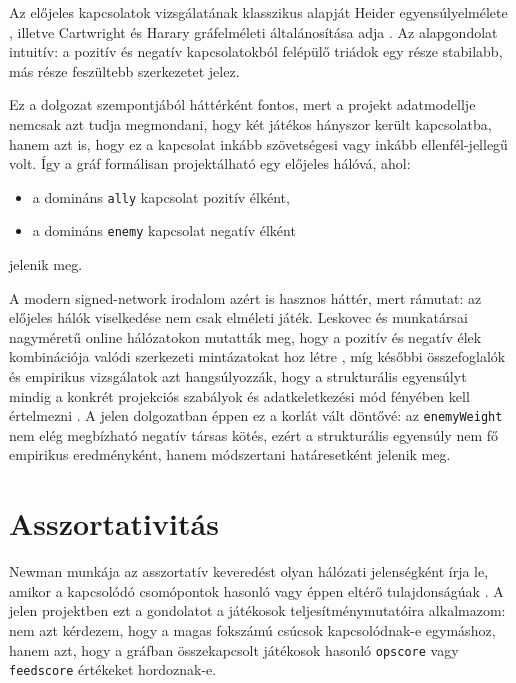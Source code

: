 ﻿\documentclass[a4paper,12pt]{report}
\begin{document}
Az előjeles kapcsolatok vizsgálatának klasszikus alapját Heider egyensúlyelmélete \cite{heider1946}, illetve Cartwright és Harary gráfelméleti általánosítása adja \cite{cartwright1956}. Az alapgondolat intuitív: a pozitív és negatív kapcsolatokból felépülő triádok egy része stabilabb, más része feszültebb szerkezetet jelez.

Ez a dolgozat szempontjából háttérként fontos, mert a projekt adatmodellje nemcsak azt tudja megmondani, hogy két játékos hányszor került kapcsolatba, hanem azt is, hogy ez a kapcsolat inkább szövetségesi vagy inkább ellenfél-jellegű volt. Így a gráf formálisan projektálható egy előjeles hálóvá, ahol:

\begin{itemize}
    \item a domináns \texttt{ally} kapcsolat pozitív élként,
    \item a domináns \texttt{enemy} kapcsolat negatív élként
\end{itemize}

jelenik meg.

A modern signed-network irodalom azért is hasznos háttér, mert rámutat: az előjeles hálók viselkedése nem csak elméleti játék. Leskovec és munkatársai nagyméretű online hálózatokon mutatták meg, hogy a pozitív és negatív élek kombinációja valódi szerkezeti mintázatokat hoz létre \cite{leskovec2010}, míg későbbi összefoglalók és empirikus vizsgálatok azt hangsúlyozzák, hogy a strukturális egyensúlyt mindig a konkrét projekciós szabályok és adatkeletkezési mód fényében kell értelmezni \cite{lerner2016,facchetti2011}. A jelen dolgozatban éppen ez a korlát vált döntővé: az \texttt{enemyWeight} nem elég megbízható negatív társas kötés, ezért a strukturális egyensúly nem fő empirikus eredményként, hanem módszertani határesetként jelenik meg.

\section{Asszortativitás}

Newman munkája az asszortatív keveredést olyan hálózati jelenségként írja le, amikor a kapcsolódó csomópontok hasonló vagy éppen eltérő tulajdonságúak \cite{newman2003}. A jelen projektben ezt a gondolatot a játékosok teljesítménymutatóira alkalmazom: nem azt kérdezem, hogy a magas fokszámú csúcsok kapcsolódnak-e egymáshoz, hanem azt, hogy a gráfban összekapcsolt játékosok hasonló \texttt{opscore} vagy \texttt{feedscore} értékeket hordoznak-e.
\end{document}
